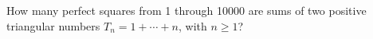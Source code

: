 How many perfect squares from 1 through 10000 are sums of two positive triangular numbers $T_n=1+\cdots+n$, with $n\ge1$?
